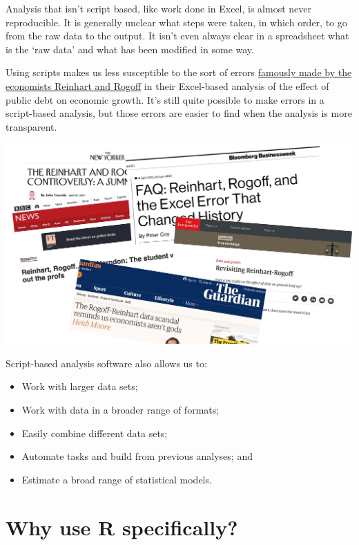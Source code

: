 \documentclass[
]{book}
\providecommand{\tightlist}{%
  \setlength{\itemsep}{0pt}\setlength{\parskip}{0pt}}
\begin{document}
Analysis that isn't script based, like work done in Excel, is almost never reproducible. It is generally unclear what steps were taken, in which order, to go from the raw data to the output. It isn't even always clear in a spreadsheet what is the `raw data' and what has been modified in some way.

Using scripts makes us less susceptible to the sort of errors \href{https://en.wikipedia.org/wiki/Growth_in_a_Time_of_Debt\#Methodological_flaws}{famously made by the economists Reinhart and Rogoff} in their Excel-based analysis of the effect of public debt on economic growth. It's still quite possible to make errors in a script-based analysis, but those errors are easier to find when the analysis is more transparent.

\includegraphics[width=31.92in]{atlas/reinhart_rogoff}

Script-based analysis software also allows us to:

\begin{itemize}
\tightlist
\item
  Work with larger data sets;
\item
  Work with data in a broader range of formats;
\item
  Easily combine different data sets;
\item
  Automate tasks and build from previous analyses; and
\item
  Estimate a broad range of statistical models.
\end{itemize}

\hypertarget{why-R}{%
\section{Why use R specifically?}\label{why-R}}
\end{document}

